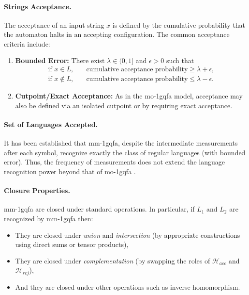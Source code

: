 \paragraph{Strings Acceptance.}  
The acceptance of an input string $x$ is defined by the cumulative probability that the automaton halts in an accepting configuration. The common acceptance criteria include:
\begin{enumerate}
  \item \textbf{Bounded Error:} There exist $\lambda\in(0,1]$ and $\epsilon>0$ such that
  \[
  \begin{aligned}
  \text{if } x\in L,&\quad \text{cumulative acceptance probability} \ge \lambda+\epsilon,\\[1mm]
  \text{if } x\notin L,&\quad \text{cumulative acceptance probability} \le \lambda-\epsilon.
  \end{aligned}
  \]
  \item \textbf{Cutpoint/Exact Acceptance:} As in the \gls{mo-1gqfa} model, acceptance may also be defined via an isolated cutpoint or by requiring exact acceptance.
\end{enumerate}

\paragraph{Set of Languages Accepted.}  
It has been established that \gls{mm-1gqfa}, despite the intermediate measurements after each symbol, recognize exactly the class of regular languages (with bounded error). Thus, the frequency of measurements does not extend the language recognition power beyond that of \gls{mo-1gqfa} \cite{li2012characterizations}.

\paragraph{Closure Properties.}  
\gls{mm-1gqfa} are closed under standard operations. In particular, if $L_1$ and $L_2$ are recognized by \gls{mm-1gqfa} then:
\begin{itemize}
  \item They are closed under \emph{union} and \emph{intersection} (by appropriate constructions using direct sums or tensor products),
  \item They are closed under \emph{complementation} (by swapping the roles of $\mathcal{H}_{acc}$ and $\mathcal{H}_{rej}$),
  \item And they are closed under other operations such as inverse homomorphism.
\end{itemize}

